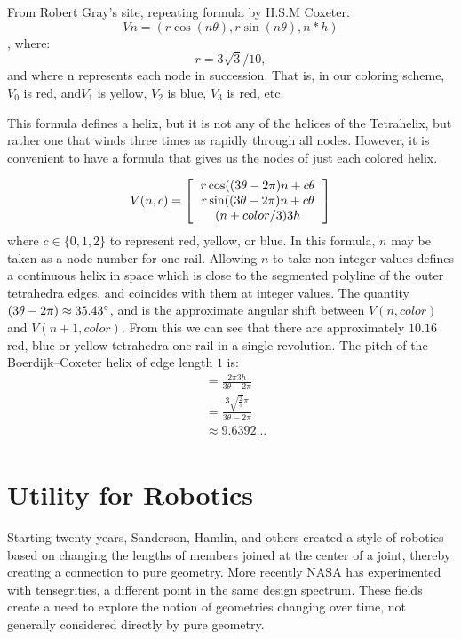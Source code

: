 \documentclass[11pt]{article}
\begin{document}
From Robert Gray's site, repeating formula by H.S.M Coxeter:
\[
Vn = (r \cos(n \theta), r \sin(n \theta), n*h)
\],
where:
\[
r = 3\sqrt{3} / 10, 
\]
and where n represents each node in succession. That is, in our coloring scheme, $V_0$ is red, and$ V_1$ is yellow,  $V_2$ is blue,
$V_3$ is red, etc. 

This formula defines a helix, but it is not any of the helices of the Tetrahelix, but rather one that winds three times
as rapidly through all nodes. However, it is convenient to have a formula that gives us the nodes of just
each colored helix.

\[
V(n,c) =
\left [
  \begin{tabular}{c}
   $ r  \cos((3 \theta - 2 \pi)n + c  \theta $\\
   $ r  \sin((3 \theta - 2 \pi)n + c  \theta $\\
   $ (n + color/3) 3  h $
  \end{tabular}
\right ]
\]
where $c \in \{0,1,2\}$ to represent red, yellow, or blue.
In this formula, $n$ may be taken as a node number for one rail. Allowing $n$ to take non-integer values defines a continuous
helix in space which is close to the segmented polyline of the outer tetrahedra edges, and coincides with them at integer
values.
The quantity $ (3 \theta - 2 \pi) \approx 35.43 \degree $, and is the approximate angular shift between $V(n,color)$ and
$V(n+1,color)$.
From this we can see that there are approximately $10.16$ red, blue or yellow tetrahedra one rail in a single revolution.
The pitch of the Boerdijk--Coxeter helix of edge length $1$ is:
\begin{align*}
  &= \frac{2 \pi  3  h}{3 \theta - 2\pi} \\
  &= \frac{3  \sqrt{\frac{2}{5}}  \pi}{3  \theta - 2 \pi} \\
  &\approx 9.6392... \\
\end{align*}




\section{Utility for Robotics}

Starting twenty years, Sanderson, Hamlin, and others created a style of robotics based on changing the lengths of members
joined at the center of a joint, thereby creating a connection to pure geometry. More recently NASA has experimented with
tensegrities, a different point in the same design spectrum. These fields create a need to explore the notion of
geometries changing over time, not generally considered directly by pure geometry.
\end{document}
